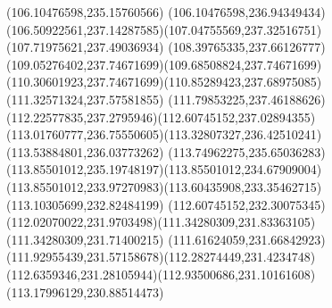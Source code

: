 \documentclass{article}
\begin{document}
{{\lineto(106.10476598,235.15760566)
\lineto(106.10476598,236.94349434)
\curveto(106.50922561,237.14287585)(107.04755569,237.32516751)(107.71975621,237.49036934)
\curveto(108.39765335,237.66126777)(109.05276402,237.74671699)(109.68508824,237.74671699)
\curveto(110.30601923,237.74671699)(110.85289423,237.68975085)(111.32571324,237.57581855)
\curveto(111.79853225,237.46188626)(112.22577835,237.2795946)(112.60745152,237.02894355)
\curveto(113.01760777,236.75550605)(113.32807327,236.42510241)(113.53884801,236.03773262)
\curveto(113.74962275,235.65036283)(113.85501012,235.19748197)(113.85501012,234.67909004)
\curveto(113.85501012,233.97270983)(113.60435908,233.35462715)(113.10305699,232.82484199)
\curveto(112.60745152,232.30075345)(112.02070022,231.9703498)(111.34280309,231.83363105)
\lineto(111.34280309,231.71400215)
\curveto(111.61624059,231.66842923)(111.92955439,231.57158678)(112.28274449,231.4234748)
\curveto(112.6359346,231.28105944)(112.93500686,231.10161608)(113.17996129,230.88514473)
\closepath
}
}
\end{document}
